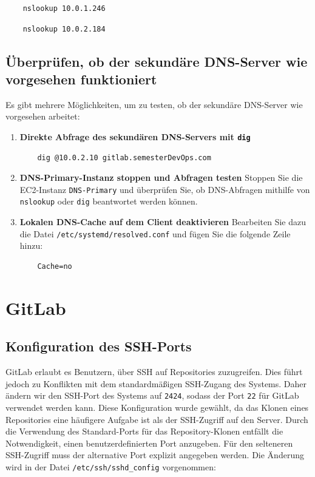\documentclass[a4paper,12pt]{article}
\begin{document}
\begin{verbatim}
	nslookup 10.0.1.246
\end{verbatim}

\begin{verbatim}
	nslookup 10.0.2.184
\end{verbatim}


\subsection{Überprüfen, ob der sekundäre DNS-Server wie vorgesehen funktioniert}  
Es gibt mehrere Möglichkeiten, um zu testen, ob der sekundäre DNS-Server wie vorgesehen arbeitet:  

\begin{enumerate}  
    \item \textbf{Direkte Abfrage des sekundären DNS-Servers mit \texttt{dig}}  
    \begin{verbatim}
    dig @10.0.2.10 gitlab.semesterDevOps.com
    \end{verbatim}  

    \item \textbf{DNS-Primary-Instanz stoppen und Abfragen testen}  
    Stoppen Sie die EC2-Instanz \texttt{DNS-Primary} und überprüfen Sie, ob DNS-Abfragen mithilfe von \texttt{nslookup} oder \texttt{dig} beantwortet werden können.  

    \item \textbf{Lokalen DNS-Cache auf dem Client deaktivieren}  
    Bearbeiten Sie dazu die Datei \texttt{/etc/systemd/resolved.conf} und fügen Sie die folgende Zeile hinzu:  
    \begin{verbatim}
    Cache=no
    \end{verbatim}  
\end{enumerate} 




\newpage

\section{GitLab}

\subsection{Konfiguration des SSH-Ports}
GitLab erlaubt es Benutzern, über SSH auf Repositories zuzugreifen. Dies führt jedoch zu Konflikten mit dem standardmäßigen SSH-Zugang des Systems. Daher ändern wir den SSH-Port des Systems auf \texttt{2424}, sodass der Port \texttt{22} für GitLab verwendet werden kann.
Diese Konfiguration wurde gewählt, da das Klonen eines Repositories eine häufigere Aufgabe ist als der SSH-Zugriff auf den Server. Durch die Verwendung des Standard-Ports für das Repository-Klonen entfällt die Notwendigkeit, einen benutzerdefinierten Port anzugeben. Für den selteneren SSH-Zugriff muss der alternative Port explizit angegeben werden.
Die Änderung wird in der Datei \texttt{/etc/ssh/sshd\_config} vorgenommen:
\end{document}
